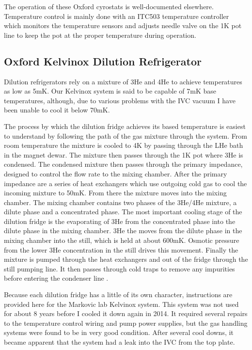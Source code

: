 The operation of these Oxford cyrostats is well-documented elsewhere. Temperature control is mainly done with an ITC503 temperature controller which monitors the temperature sensors and adjusts needle valve on the 1K pot line to keep the pot at the proper temperature during operation.

\subsection{Oxford Kelvinox Dilution Refrigerator}


Dilution refrigerators rely on a mixture of 3He and 4He to achieve temperatures as low as 5mK. Our Kelvinox system is said to be capable of 7mK base temperatures, although, due to various problems with the IVC vacuum I have been unable to cool it below 70mK.

The process by which the dilution fridge achieves its based temperature is easiest to understand by following the path of the gas mixture through the system. From room temperature the mixture is cooled to 4K by passing through the LHe bath in the magnet dewar. The mixture then passes through the 1K pot where 3He is condensed. The condensed mixture then passes through the primary impedance, designed to control the flow rate to the mixing chamber. After the primary impedance are a series of heat exchangers which use outgoing cold gas to cool the incoming mixture to 50mK. From there the mixture moves into the mixing chamber. The mixing chamber contains two phases of the 3He/4He mixture, a dilute phase and a concentrated phase. The most important cooling stage of the dilution fridge is the evaporating of 3He from the concentrated phase into the dilute phase in the mixing chamber. 3He the moves from the dilute phase in the mixing chamber into the still, which is held at about 600mK. Osmotic pressure from the lower 3He concentration in the still drives this movement. Finally the mixture is pumped through the heat exchangers and out of the fridge through the still pumping line. It then passes through cold traps to remove any impurities before entering the condenser line \cite{Balshaw2001}.

Because each dilution fridge has a little of its own character, instructions are provided here for the Markovic lab Kelvinox system. This system was not used for about 8 years before I cooled it down again in 2014. It required several repairs to the temperature control wiring and pump power supplies, but the gas handling systems were found to be in very good condition. After several cool downs, it became apparent that the system had a leak into the IVC from the top plate.

